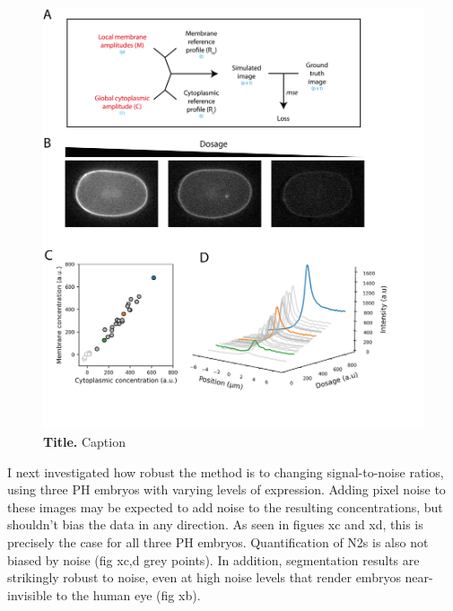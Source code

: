 \documentclass[12pt]{"article"}
\newcommand{\mycaption}[2]{\caption[#1]{\textbf{#1.} #2}}
\begin{document}
\begin{figure}[!h]
\includegraphics[scale=1]{memquant_benchmarking_ph_rundown}
\setlength{\abovecaptionskip}{20pt}
\centering
\mycaption{Title}{Caption}
\label{fig:memquant_benchmarking_ph_rundown}
\end{figure}

I next investigated how robust the method is to changing signal-to-noise ratios, using three PH embryos with varying levels of expression. Adding pixel noise to these images may be expected to add noise to the resulting concentrations, but shouldn’t bias the data in any direction. As seen in figues xc and xd, this is precisely the case for all three PH embryos. Quantification of N2s is also not biased by noise (fig xc,d grey points). In addition, segmentation results are strikingly robust to noise, even at high noise levels that render embryos near-invisible to the human eye (fig xb).\\
\end{document}
